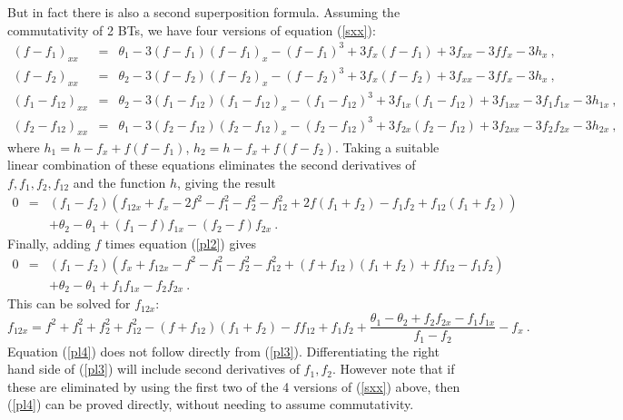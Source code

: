 \documentclass[12pt]{article}
\begin{document}
But in fact there is also a second superposition formula.
Assuming the commutativity of 2 BTs, we have four versions of equation (\ref{sxx}): 
\begin{eqnarray*}
  (f-f_1)_{xx} &=&  \theta_1  -  3(f-f_1)(f-f_1)_x  - (f-f_1)^3 + 3f_x (f-f_1)  + 3f_{xx} - 3ff_x - 3h_x\ , \\
  (f-f_2)_{xx} &=&  \theta_2  -  3(f-f_2)(f-f_2)_x  - (f-f_2)^3 + 3f_x (f-f_2)  + 3f_{xx} - 3ff_x - 3h_x \ ,\\
  (f_1-f_{12})_{xx} &=&  \theta_2  -  3(f_1-f_{12})(f_1-f_{12})_x  - (f_1-f_{12})^3 + 3f_{1x} (f_1-f_{12})  + 3f_{1xx} - 3f_1f_{1x} - 3h_{1x}\ ,  \\
  (f_2-f_{12})_{xx} &=&  \theta_1  -  3(f_2-f_{12})(f_2-f_{12})_x  - (f_2-f_{12})^3 + 3f_{2x} (f_2-f_{12})  + 3f_{2xx} - 3f_2f_{2x} - 3h_{2x}\ ,  
\end{eqnarray*}
where $h_1 = h-f_x+f(f-f_1)$, $h_2 = h-f_x+f(f-f_2)$. Taking a suitable linear combination of these equations eliminates
the second derivatives of $f,f_1,f_2,f_{12}$ and the function $h$, giving the result 
\begin{eqnarray*}
0 &=& \left(f_1-f_2 \right)
\left( f_{12x}+f_x -2f^2 -f_1^2 -f_2^2 -f_{12}^2  +2f(f_1+f_2)  
-f_1f_2+ f_{12}(f_1+f_2)  \right) \nonumber \\ 
&& + \theta_2-\theta_1 + (f_1-f)f_{1x} - (f_2-f)f_{2x}\ .  
\end{eqnarray*}
Finally, adding $f$ times equation (\ref{pl2})  gives 
\begin{eqnarray}
0 &=& \left(f_1-f_2 \right)
\left( f_x+f_{12x}  - f^2 - f_1^2 - f_2^2  - f_{12}^2  +  (f+f_{12})(f_1+f_2) + ff_{12} -  f_1f_2  \right)
\nonumber \\ 
&& +  \theta_2-\theta_1  + f_1f_{1x} - f_2f_{2x} 
  \ .  \label{pl1}
\end{eqnarray}
This can be solved for $f_{12x}$:
\begin{equation} 
f_{12x}  =   f^2 + f_1^2 +f_2^2  + f_{12}^2  - (f+f_{12})(f_1+f_2) - ff_{12} +  f_1f_2
  +  \frac{ \theta_1-\theta_2  + f_2f_{2x} - f_1f_{1x} }{f_1-f_2}   - f_x  \ .
    \label{pl4}  
\end{equation}
Equation (\ref{pl4}) does not follow directly from (\ref{pl3}). Differentiating the right
hand side of (\ref{pl3}) will include second derivatives of $f_1,f_2$. However note that if these are eliminated 
by using the first two of the 4 versions of (\ref{sxx}) above, then (\ref{pl4}) can be proved directly,
without needing to assume commutativity. 
\end{document}
